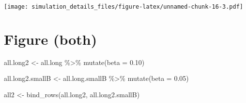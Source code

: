 \documentclass[
]{article}
\newenvironment{Shaded}{\begin{snugshade}}{\end{snugshade}}
\newcommand{\AttributeTok}[1]{\textcolor[rgb]{0.77,0.63,0.00}{#1}}
\newcommand{\FloatTok}[1]{\textcolor[rgb]{0.00,0.00,0.81}{#1}}
\newcommand{\FunctionTok}[1]{\textcolor[rgb]{0.00,0.00,0.00}{#1}}
\newcommand{\NormalTok}[1]{#1}
\newcommand{\OtherTok}[1]{\textcolor[rgb]{0.56,0.35,0.01}{#1}}
\newcommand{\SpecialCharTok}[1]{\textcolor[rgb]{0.00,0.00,0.00}{#1}}
\begin{document}
\texttt{[image: simulation\_details\_files/figure-latex/unnamed-chunk-16-3.pdf]}

\hypertarget{figure-both}{%
\section{Figure (both)}\label{figure-both}}

\begin{Shaded}
\begin{Highlighting}[]
\NormalTok{all.long2 }\OtherTok{\textless{}{-}}\NormalTok{ all.long }\SpecialCharTok{\%\textgreater{}\%}
  \FunctionTok{mutate}\NormalTok{(}\AttributeTok{beta =} \FloatTok{0.10}\NormalTok{)}

\NormalTok{all.long2.smallB }\OtherTok{\textless{}{-}}\NormalTok{ all.long.smallB }\SpecialCharTok{\%\textgreater{}\%}
  \FunctionTok{mutate}\NormalTok{(}\AttributeTok{beta =} \FloatTok{0.05}\NormalTok{)}

\NormalTok{all2 }\OtherTok{\textless{}{-}} \FunctionTok{bind\_rows}\NormalTok{(all.long2,}
\NormalTok{                  all.long2.smallB)}
\end{Highlighting}
\end{Shaded}
\end{document}
